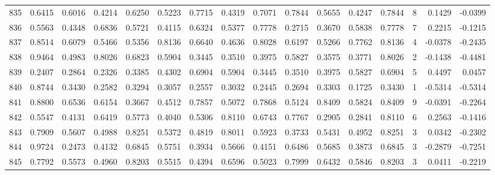 \begin{tabular}{lrrrrrrrrrrrrrrr}
835 &      0.6415 &  0.6016 &  0.4214 &  0.6250 &  0.5223 &  0.7715 &  0.4319 &  0.7071 &  0.7844 &  0.5655 &   0.4247 &     0.7844 &      8 &                    0.1429 &                    -0.0399 \\
836 &      0.5563 &  0.4348 &  0.6836 &  0.5721 &  0.4115 &  0.6324 &  0.5377 &  0.7778 &  0.2715 &  0.3670 &   0.5838 &     0.7778 &      7 &                    0.2215 &                    -0.1215 \\
837 &      0.8514 &  0.6079 &  0.5466 &  0.5356 &  0.8136 &  0.6640 &  0.4636 &  0.8028 &  0.6197 &  0.5266 &   0.7762 &     0.8136 &      4 &                   -0.0378 &                    -0.2435 \\
838 &      0.9464 &  0.4983 &  0.8026 &  0.6823 &  0.5904 &  0.3445 &  0.3510 &  0.3975 &  0.5827 &  0.3575 &   0.3771 &     0.8026 &      2 &                   -0.1438 &                    -0.4481 \\
839 &      0.2407 &  0.2864 &  0.2326 &  0.3385 &  0.4302 &  0.6904 &  0.5904 &  0.3445 &  0.3510 &  0.3975 &   0.5827 &     0.6904 &      5 &                    0.4497 &                     0.0457 \\
840 &      0.8744 &  0.3430 &  0.2582 &  0.3294 &  0.3057 &  0.2557 &  0.3032 &  0.2445 &  0.2694 &  0.3303 &   0.1725 &     0.3430 &      1 &                   -0.5314 &                    -0.5314 \\
841 &      0.8800 &  0.6536 &  0.6154 &  0.3667 &  0.4512 &  0.7857 &  0.5072 &  0.7868 &  0.5124 &  0.8409 &   0.5824 &     0.8409 &      9 &                   -0.0391 &                    -0.2264 \\
842 &      0.5547 &  0.4131 &  0.6419 &  0.5773 &  0.4040 &  0.5306 &  0.8110 &  0.6743 &  0.7767 &  0.2905 &   0.2841 &     0.8110 &      6 &                    0.2563 &                    -0.1416 \\
843 &      0.7909 &  0.5607 &  0.4988 &  0.8251 &  0.5372 &  0.4819 &  0.8011 &  0.5923 &  0.3733 &  0.5431 &   0.4952 &     0.8251 &      3 &                    0.0342 &                    -0.2302 \\
844 &      0.9724 &  0.2473 &  0.4132 &  0.6845 &  0.5751 &  0.3934 &  0.5666 &  0.4151 &  0.6486 &  0.5685 &   0.3873 &     0.6845 &      3 &                   -0.2879 &                    -0.7251 \\
845 &      0.7792 &  0.5573 &  0.4960 &  0.8203 &  0.5515 &  0.4394 &  0.6596 &  0.5023 &  0.7999 &  0.6432 &   0.5846 &     0.8203 &      3 &                    0.0411 &                    -0.2219 \\

\end{tabular}
